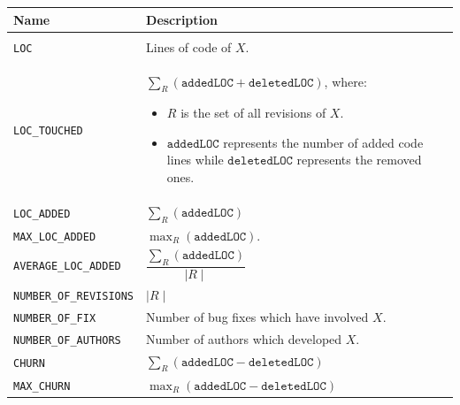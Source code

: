 \documentclass[sigconf]{acmart}
\begin{document}
\begin{table}


\begin{tabular}{l|p{6cm}}

\toprule
\textbf{Name} & \textbf{Description} \\
\midrule

\\

\texttt{LOC} & Lines of code of $X$. 

\\

\texttt{LOC\_TOUCHED} & $\sum_R (\texttt{addedLOC} + \texttt{deletedLOC})$, where: 

\begin{itemize}
\item $R$ is the set of all revisions of $X$.
\item $\texttt{addedLOC}$ represents the number of added code lines while $\texttt{deletedLOC}$ represents the removed ones.
\end{itemize}

\\

\texttt{LOC\_ADDED} & $\sum_R (\texttt{addedLOC})$

\\

\texttt{MAX\_LOC\_ADDED} & $\max_R (\texttt{addedLOC})$.

\\
    
\texttt{AVERAGE\_LOC\_ADDED} & $\dfrac{\sum_R (\texttt{addedLOC})}{\mid R \mid}$

\\

\texttt{NUMBER\_OF\_REVISIONS} & $\mid R \mid$ 

\\

\texttt{NUMBER\_OF\_FIX} & Number of bug fixes which have involved $X$.

\\

\texttt{NUMBER\_OF\_AUTHORS} & Number of authors which developed $X$.

\\

\texttt{CHURN} & $\sum_R (\texttt{addedLOC} - \texttt{deletedLOC})$

\\

\texttt{MAX\_CHURN} & $\max_R (\texttt{addedLOC} - \texttt{deletedLOC})$


\end{tabular}
\end{table}
\end{document}
